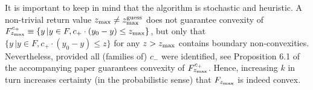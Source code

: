 \documentclass[a4paper]{article}
\theoremstyle{definition}
\begin{document}
\begin{enumerate}
It is important to keep in mind that the algorithm is stochastic and heuristic.
A non-trivial return value $z_{\max}\neq z^{\rm guess}_{\rm max}$ does not guarantee convexity of  $F^{c_+}_{z_{\rm max}}\equiv \{y\, | y\in F, c_+ \cdot (y_0-y)\leq z_{\rm max}\}$, but only that $\{y\, | y\in F,c_+ \cdot (y_0-y)\leq z\}$ for any $z>z_{\rm max}$ contains boundary non-convexities.
Nevertheless, provided all (families of) $c_-$ were identified, see Proposition 6.1 of the accompanying paper guarantees convexity of $F^{c_+}_{z_{\rm max}}$. Hence, increasing $k$ in turn increases certainty (in the probabilistic sense) that $F_{z_{\rm max}}$ is indeed convex.

\end{enumerate}
\end{document}
